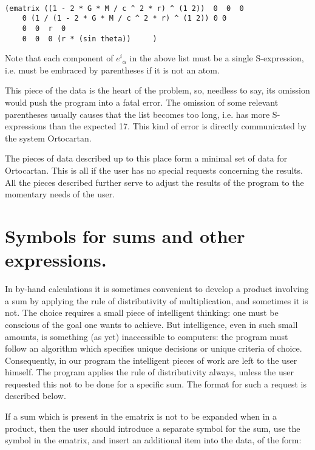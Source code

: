 \bigskip

\begin{verbatim}

(ematrix ((1 - 2 * G * M / c ^ 2 * r) ^ (1 2))  0  0  0
    0 (1 / (1 - 2 * G * M / c ^ 2 * r) ^ (1 2)) 0 0
    0  0  r  0
    0  0  0 (r * (sin theta))     )

\end{verbatim}

\bigskip

\noindent Note that each component of ${e^i}_{\alpha}$ in the above list must
be a single S-expression, i.e. must be embraced by parentheses if
     it is not an atom.

This piece of the data is the heart of the problem, so, needless to say, its
omission would push the program into a fatal error. The omission of some
relevant parentheses  usually  causes  that  the list becomes too long, i.e.
has more
     S-expressions than the expected 17. This kind  of  error  is
     directly communicated by the system Ortocartan.

The pieces of data described up to this  place  form  a
     minimal  set of data for Ortocartan. This is all if the user
     has no special requests  concerning  the  results.  All  the
pieces described further serve to adjust the results of the program to the
momentary needs of the user.

\section{Symbols for sums and other expressions.}

In by-hand calculations it is sometimes  convenient  to
     develop  a  product  involving a sum by applying the rule of
     distributivity of multiplication, and sometimes it  is  not.
     The  choice  requires a small piece of intelligent thinking:
one must be conscious of the goal one wants to achieve. But intelligence, even
in such  small amounts, is something (as
     yet) inaccessible to computers: the program must  follow  an
algorithm which specifies unique decisions or unique criteria of choice.
Consequently, in our program the  intelligent  pieces  of work are left to the
user himself. The program applies the rule of distributivity always,  unless
the user  requested  this not to be done for a specific sum. The format for
such a request is described below.

If a sum which is present in the ematrix is not  to  be
     expanded when in a product, then the user should introduce a
     separate symbol for the sum, use the symbol in the  ematrix,
     and insert an additional item into the data, of the form:

